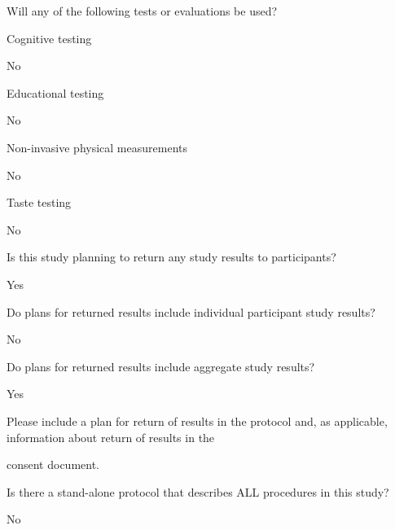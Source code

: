 \documentclass[10pt, letterpaper]{article}
\begin{document}
Will any of the following tests or evaluations be used?

\begin{responsebox}

Cognitive testing

No

Educational testing

No

Non-invasive physical measurements

No

Taste testing

No

\end{responsebox}

Is this study planning to return any study results to participants?

Yes

\begin{responsebox}

Do plans for returned results include individual participant study results?

No

Do plans for returned results include aggregate study results?

Yes

Please include a plan for return of results in the protocol and, as applicable, information about return of results in the

consent document.

\end{responsebox}

Is there a stand-alone protocol that describes ALL procedures in this study?

\vspace{0.5em}

No
\end{document}
